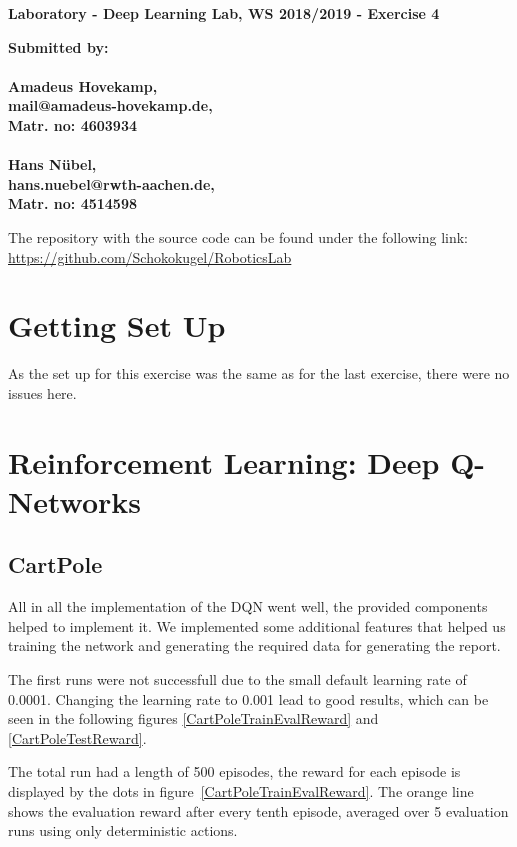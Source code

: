 \documentclass[
        a4paper,
        10pt,
        parskip = full,    %
    ]{scrartcl}
\begin{document}
\textbf{\large{Laboratory - Deep Learning Lab, WS 2018/2019 - Exercise 4}}

\textbf{\large{Submitted by:\\
\\
Amadeus Hovekamp,\\
mail@amadeus-hovekamp.de,\\
Matr. no: 4603934\\
\\
Hans Nübel,\\
hans.nuebel@rwth-aachen.de,\\
Matr. no: 4514598}}

The repository with the source code can be found under the following link:\\
\href{https://github.com/Schokokugel/RoboticsLab}
     {https://github.com/Schokokugel/RoboticsLab}


\section{Getting Set Up}

As the set up for this exercise was the same as for the last exercise, there were no issues here.

\section{Reinforcement Learning: Deep Q-Networks}

\subsection{CartPole}

All in all the implementation of the DQN went well, the provided components
helped to implement it. We implemented some additional features that helped us
training the network and generating the required data for generating the report.


The first runs were not successfull due to the small default learning
rate of 0.0001. Changing the learning rate to 0.001 lead to good results,
which can be seen in the following figures \ref{CartPoleTrainEvalReward}
and \ref{CartPoleTestReward}.


The total run had a length of 500 episodes, the reward for each episode is
displayed by the dots in figure~\ref{CartPoleTrainEvalReward}. The orange line
shows the evaluation reward after every tenth episode, averaged over 5 evaluation
runs using only deterministic actions.
\end{document}

